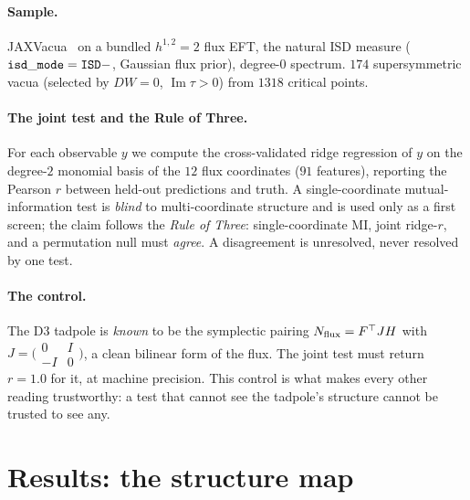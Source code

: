 \documentclass[11pt]{article}
\begin{document}
\paragraph{Sample.} JAXVacua~\cite{jaxvacua} on a bundled $h^{1,2}=2$ flux EFT, the
natural ISD measure (${\tt isd\_mode}={\tt ISD-}$, Gaussian flux prior),
degree-$0$ spectrum. $174$ supersymmetric vacua (selected by $DW=0$,
$\operatorname{Im}\tau>0$) from $1318$ critical points.

\paragraph{The joint test and the Rule of Three.} For each observable $y$ we compute
the cross-validated ridge regression of $y$ on the degree-$2$ monomial basis of the
$12$ flux coordinates ($91$ features), reporting the Pearson $r$ between held-out
predictions and truth. A single-coordinate mutual-information test is \emph{blind} to
multi-coordinate structure and is used only as a first screen; the claim follows the
\emph{Rule of Three}: single-coordinate MI, joint ridge-$r$, and a permutation null
must \emph{agree}. A disagreement is unresolved, never resolved by one test.

\paragraph{The control.} The D3 tadpole is \emph{known} to be the symplectic pairing
$N_{\rm flux} = F^\top J H$ with $J = \bigl(\begin{smallmatrix}0&I\\-I&0\end{smallmatrix}\bigr)$,
a clean bilinear form of the flux. The joint test must return $r = 1.0$ for it, at
machine precision. This control is what makes every other reading trustworthy: a
test that cannot see the tadpole's structure cannot be trusted to see any.

\section{Results: the structure map}
\end{document}
